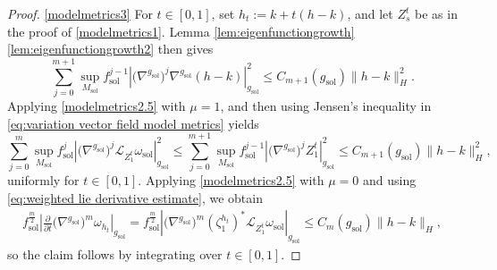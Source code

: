 \documentclass[10pt,a4paper]{amsart}
\providecommand{\sol}{\operatorname{sol}}
\begin{document}
\begin{proof}
\ref{modelmetrics3} For $t\in[0,1]$, set $h_t := k+t(h-k)$, and let $Z_s^t$ be as in the proof of \ref{modelmetrics1}. 
Lemma
\ref{lem:eigenfunctiongrowth}\ref{lem:eigenfunctiongrowth2}
then gives
\begin{equation}\label{eq:weighted derivatives gradient h minus k}
\sum_{j=0}^{m+1}
\sup_{M_{\sol}}
f_{\sol}^{j-1}
\left|
    \bigl(\nabla^{g_{\sol}}\bigr)^j
    \nabla^{g_{\sol}}(h-k)
\right|_{g_{\sol}}^2
\leq
C_{m+1}(g_{\sol})
\|h-k\|_H^2.
\end{equation}
Applying \ref{modelmetrics2.5} with
$\mu=1$, and then using Jensen's inequality in
\eqref{eq:variation vector field model metrics} yields
\begin{equation}\label{eq:weighted lie derivative estimate}
\sum_{j=0}^{m}
\sup_{M_{\sol}}
f_{\sol}^{j}
\left|
    \bigl(\nabla^{g_{\sol}}\bigr)^j
    \mathcal{L}_{Z_1^t}\omega_{\sol}
\right|_{g_{\sol}}^2\leq \sum_{j=0}^{m+1}
\sup_{M_{\sol}}
f_{\sol}^{j-1}
\left|
    \bigl(\nabla^{g_{\sol}}\bigr)^jZ_1^t
\right|_{g_{\sol}}^2
\leq
C_{m+1}(g_{\sol})
\|h-k\|_H^2,
\end{equation}
uniformly for $t\in[0,1]$. 
Applying \ref{modelmetrics2.5} with
$\mu=0$ and using
\eqref{eq:weighted lie derivative estimate}, we obtain
\begin{align*}
f_{\sol}^{\frac{m}{2}}
\left|
    \frac{\partial}{\partial t}
    \bigl(\nabla^{g_{\sol}}\bigr)^m\omega_{h_t}
\right|_{g_{\sol}}
=
f_{\sol}^{\frac{m}{2}}
\left|
    \bigl(\nabla^{g_{\sol}}\bigr)^m
    \left(\zeta_1^{h_t}\right)^*
    \mathcal{L}_{Z_1^t}\omega_{\sol}
\right|_{g_{\sol}}\leq
C_m(g_{\sol})\|h-k\|_H,
\end{align*}
so the claim follows by integrating over $t\in[0,1]$.


\end{proof}
\end{document}

